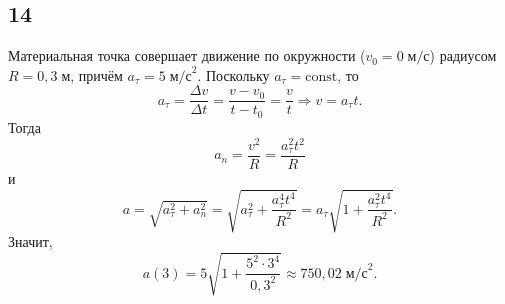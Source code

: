 \subsection{14}

Материальная точка совершает движение по окружности ($v_0=0\;\text{м/с}$) радиусом $R=0{,}3\;\text{м}$, причём $a_\tau=5\;\text{м/с}^2$. Поскольку $a_\tau=\text{const}$, то
\[
a_\tau=\frac{\Delta v}{\Delta t}=\frac{v-v_0}{t-t_0}=\frac{v}{t}\Rightarrow v=a_\tau t.
\]
Тогда
\[
a_n=\frac{v^2}{R}=\frac{a^2_\tau t^2}{R}
\]
и
\[
a=\sqrt{a^2_\tau+a^2_n}=\sqrt{a^2_\tau+\frac{a^4_\tau t^4}{R^2}}=a_\tau\sqrt{1+\frac{a^2_\tau t^4}{R^2}}.
\]
Значит,
\[
a(3)=5\sqrt{1+\frac{5^2\cdot3^4}{0{,}3^2}}\approx750{,}02\;\text{м/с}^2.
\]